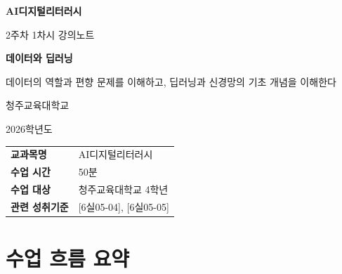\documentclass[11pt,a4paper]{article}
\begin{document}
\begin{titlepage}
\centering
\vspace*{3cm}

{\Huge\bfseries\color{primary} AI디지털리터러시}

\vspace{0.5cm}

{\LARGE\color{darkblue} 2주차 1차시 강의노트}

\vspace{1.5cm}

{\Huge\bfseries 데이터와 딥러닝}

\vspace{0.5cm}

{\Large\color{darkgray} 데이터의 역할과 편향 문제를 이해하고, 딥러닝과 신경망의 기초 개념을 이해한다}

\vspace{3cm}

{\large 청주교육대학교}

\vspace{0.3cm}

{\large 2026학년도}

\vspace{2cm}

\begin{tcolorbox}[colback=lightblue, colframe=primary, width=0.8\textwidth, halign=center]
\begin{tabular}{ll}
\textbf{교과목명} & AI디지털리터러시 \\
\textbf{수업 시간} & 50분 \\
\textbf{수업 대상} & 청주교육대학교 4학년 \\
\textbf{관련 성취기준} & {[6실05-04]}, {[6실05-05]} \\
\end{tabular}
\end{tcolorbox}

\end{titlepage}

\tableofcontents
\newpage

\section*{ 수업 흐름 요약}
\end{document}
